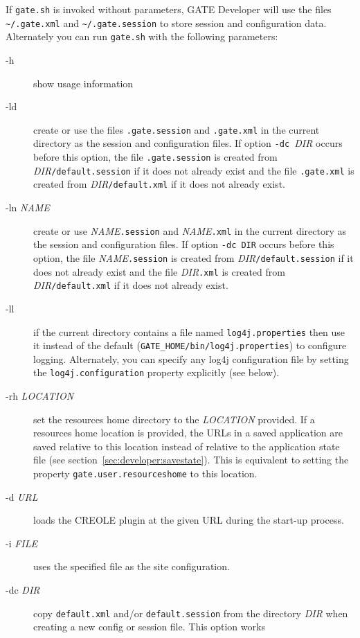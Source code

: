 If \verb|gate.sh| is invoked without parameters, GATE Developer will use the 
files \verb|~/.gate.xml| and \verb|~/.gate.session| to store session and 
configuration data. Alternately you can run \verb|gate.sh| with the 
following parameters:
\begin{description}
  \item[-h] show usage information
  \item[-ld] create or use the files \texttt{.gate.session} and 
     \texttt{.gate.xml} in the current directory as the session and
     configuration files. If option \texttt{-dc }\emph{DIR} occurs before this option,
     the file \texttt{.gate.session} is created from \emph{DIR}\texttt{/default.session}
     if it does not already exist and the file \texttt{.gate.xml} is created 
     from \emph{DIR}\texttt{/default.xml} if it does not already exist.
  \item[-ln \emph{NAME}] create or use \emph{NAME}\texttt{.session} and
    \emph{NAME}\texttt{.xml} in the current directory as the session and 
    configuration files. If option \texttt{-dc DIR} occurs before this option,
     the file \emph{NAME}\texttt{.session} is created from \emph{DIR}\texttt{/default.session}
     if it does not already exist and the file \emph{DIR}\texttt{.xml} is created 
     from \emph{DIR}\texttt{/default.xml} if it does not already exist.
  \item[-ll] if the current directory contains a file named \texttt{log4j.properties} 
    then use it instead of the default (\verb|GATE_HOME/bin/log4j.properties|) to
    configure logging. Alternately, you can specify any log4j configuration file 
    by setting the \texttt{log4j.configuration} property explicitly (see below).
  \item[-rh \emph{LOCATION}] set the resources home directory to the \emph{LOCATION} provided. 
    If a resources home location is provided, the URLs in a saved application are
    saved relative to this location instead of relative to the application state file
    (see section~\ref{sec:developer:savestate}).
    This is equivalent to setting the property \texttt{gate.user.resourceshome} to
    this location.
  \item[-d \emph{URL}] loads the CREOLE plugin at the given URL during the
  start-up process.
  \item[-i \emph{FILE}] uses the specified file as the site configuration.
  \item[-dc \emph{DIR}] copy \texttt{default.xml} and/or \texttt{default.session} 
    from the directory \emph{DIR} when creating a new config or session file. This option works

\end{description}
